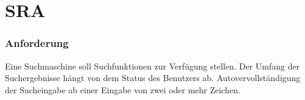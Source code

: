 \section{SRA}

\begin{frame}   
  \frametitle{Anforderung} 
   \newline
  Eine Suchmaschine soll Suchfunktionen zur Verfügung stellen.
  Der Umfang der Suchergebnisse hängt von dem Status des Benutzers ab. \newline 
  \newline
   \newline
  Autovervollständigung der Sucheingabe ab einer Eingabe von zwei oder mehr 
  Zeichen.
\end{frame}
